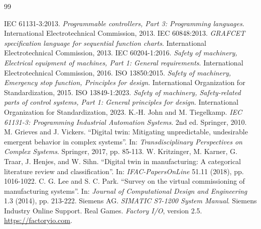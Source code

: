 \documentclass[11pt,a4paper]{report}
\begin{document}
\renewcommand{\bibname}{References}
\clearpage{}
\begin{thebibliography}{99}
 IEC 61131-3:2013. \textit{Programmable controllers, Part 3: Programming languages}. International Electrotechnical Commission, 2013.
 IEC 60848:2013. \textit{GRAFCET specification language for sequential function charts}. International Electrotechnical Commission, 2013.
 IEC 60204-1:2016. \textit{Safety of machinery, Electrical equipment of machines, Part 1: General requirements}. International Electrotechnical Commission, 2016.
 ISO 13850:2015. \textit{Safety of machinery, Emergency stop function, Principles for design}. International Organization for Standardization, 2015.
 ISO 13849-1:2023. \textit{Safety of machinery, Safety-related parts of control systems, Part 1: General principles for design}. International Organization for Standardization, 2023.
 K.-H. John and M. Tiegelkamp. \textit{IEC 61131-3: Programming Industrial Automation Systems}. 2nd ed. Springer, 2010.
 M. Grieves and J. Vickers. ``Digital twin: Mitigating unpredictable, undesirable emergent behavior in complex systems''. In: \textit{Transdisciplinary Perspectives on Complex Systems}. Springer, 2017, pp. 85-113.
 W. Kritzinger, M. Karner, G. Traar, J. Henjes, and W. Sihn. ``Digital twin in manufacturing: A categorical literature review and classification''. In: \textit{IFAC-PapersOnLine} 51.11 (2018), pp. 1016-1022.
 C. G. Lee and S. C. Park. ``Survey on the virtual commissioning of manufacturing systems''. In: \textit{Journal of Computational Design and Engineering} 1.3 (2014), pp. 213-222.
 Siemens AG. \textit{SIMATIC S7-1200 System Manual}. Siemens Industry Online Support.
 Real Games. \textit{Factory I/O}, version 2.5. \url{https://factoryio.com}.
\end{thebibliography}

\appendix
\renewcommand{\chaptermark}[1]{\markboth{Appendix \thechapter.\ #1}{}}
\end{document}
